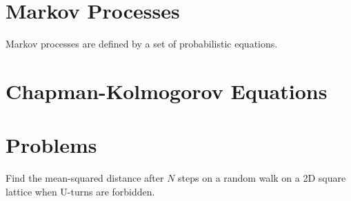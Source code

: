 \section{Markov Processes}

Markov processes are defined by a set of probabilistic equations. 

\section{Chapman-Kolmogorov Equations}

\section{Problems}

\begin{problem}
	Find the mean-squared distance after $N$ steps on a random walk on a 2D square lattice when U-turns are forbidden.
\end{problem}

